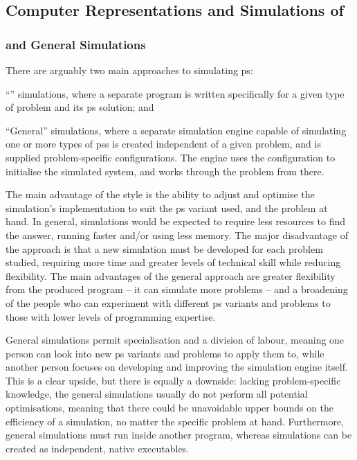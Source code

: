 
\subsection{Computer Representations and Simulations of }

\subsubsection{\Adhoc{} and General Simulations}
There are arguably two main approaches to simulating \gls{ps}:
\begin{inparaenum}[a)]
\item ``\Adhoc{}'' simulations, where a separate program is written specifically for a given type of problem and its \gls{ps} solution; and
\item ``General'' simulations, where a separate simulation engine capable of simulating one or more types of \glspl{ps} is created independent of a given problem, and is supplied problem-specific configurations.  The engine uses the configuration to initialise the simulated system, and works through the problem from there.
\end{inparaenum}

The main advantage of the \adhoc{} style is the ability to adjust and optimise the simulation's implementation to suit the \gls{ps} variant used, and the problem at hand.  In general, \adhoc{} simulations would be expected to require less resources to find the answer, \eg{} running faster and/or using less memory.  The major disadvantage of the \adhoc{} approach is that a new simulation must be developed for each problem studied, requiring more time and greater levels of technical skill while reducing flexibility.  The main advantages of the general approach are greater flexibility from the produced program -- \ie{} it can simulate more problems -- and a broadening of the people who can experiment with different \gls{ps} variants and problems to those with lower levels of programming expertise.

General simulations permit specialisation and a division of labour, meaning one person can look into new \gls{ps} variants and problems to apply them to, while another person focuses on developing and improving the simulation engine itself.  This is a clear upside, but there is equally a downside: lacking problem-specific knowledge, the general simulations usually do not perform all potential optimisations, meaning that there could be unavoidable upper bounds on the efficiency of a simulation, no matter the specific problem at hand.  Furthermore, general simulations must run inside another program, whereas \adhoc{} simulations can be created as independent, native executables.

